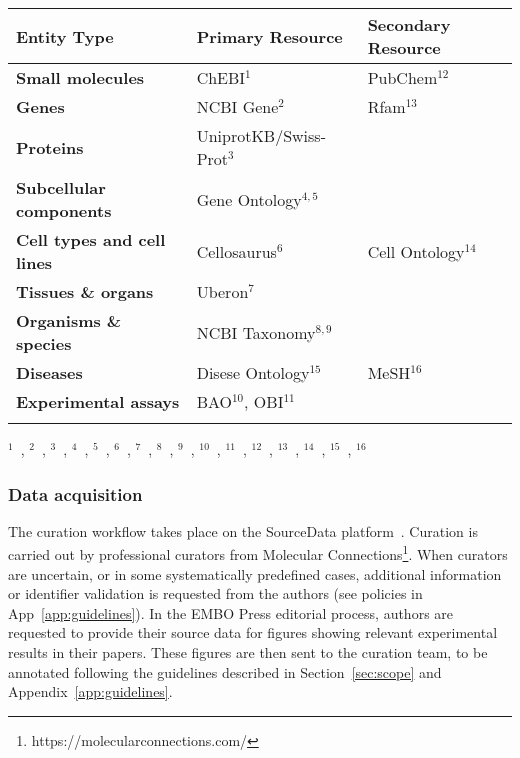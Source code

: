 \documentclass{bioinfo}
\begin{document}
\begin{methods}
\begin{table}[!t]
{    \begin{tabular}{@{}l|ll@{}}\toprule 
    \textbf{Entity Type}               & \textbf{Primary Resource}           & \textbf{Secondary Resource}      \\\midrule
    \textbf{Small molecules}           & ChEBI$^1$                           & PubChem$^{12}$                   \\
    \textbf{Genes}                     & NCBI Gene$^2$                       & Rfam$^{13}$                      \\
    \textbf{Proteins}                  & UniprotKB/Swiss-Prot$^3$            &                                  \\
    \textbf{Subcellular components}       & Gene Ontology$^{4,5}$               &                                  \\
    \textbf{Cell types and cell lines} & Cellosaurus$^6$                     & Cell Ontology$^{14}$             \\
    \textbf{Tissues \& organs}         & Uberon$^7$                          &                                  \\
    \textbf{Organisms \& species}      & NCBI Taxonomy$^{8,9}$               &                                  \\
    \textbf{Diseases}                  & Disese Ontology$^{15}$              & MeSH$^{16}$                      \\
    \textbf{Experimental assays}       & BAO$^{10}$, OBI$^{11}$              &                                  \\\botrule
    \end{tabular}}{
    $^1$~\citealp{chebi}, $^2$~\citealp{ncbigene}, $^3$~\citealp{uniprot}, 
    $^4$~\citealp{geneont1}, $^5$~\citealp{genont2}, $^6$~\citealp{cellosaurus}, 
    $^7$~\citealp{uberon}, $^8$~\citealp{ncbitaxonomy1}, $^9$~\citealp{ncbitaxonomy2}, 
    $^{10}$~\citealp{bao}, $^{11}$~\citealp{obi}, $^{12}$~\citealp{pubchem}, $^{13}$~\citealp{rfam}, $^{14}$~\citealp{cellont}, $^{15}$~\citealp{do}, $^{16}$~\citealp{mesh}
    }
\end{table}

\subsubsection{Data acquisition}

The curation workflow takes place on the SourceData platform~\citep{sourcedata}. Curation is carried out by professional curators from Molecular Connections\footnote{https://molecularconnections.com/}. When curators are uncertain, or in some systematically predefined cases, additional information or identifier validation is requested from the authors (see policies in App~\ref{app:guidelines}). In the EMBO Press editorial process, authors are requested to provide their source data for figures showing relevant experimental results in their papers. These figures are then sent to the curation team, to be annotated following the guidelines described in Section~\ref{sec:scope} and Appendix~\ref{app:guidelines}. 


\end{methods}
\end{document}
